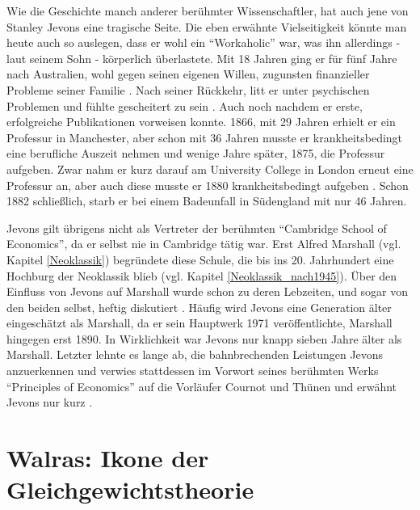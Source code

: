 Wie die Geschichte manch anderer berühmter Wissenschaftler, hat auch jene von Stanley Jevons eine tragische Seite. Die eben erwähnte Vielseitigkeit könnte man heute auch so auslegen, dass er wohl ein "`Workaholic"' war, was ihn allerdings - laut seinem Sohn \parencite[S. 230]{Jevons1934} - körperlich überlastete. Mit 18 Jahren ging er für fünf Jahre nach Australien, wohl gegen seinen eigenen Willen, zugunsten finanzieller Probleme seiner Familie \parencite[S. 518]{Keynes1936a}. Nach seiner Rückkehr, litt er unter psychischen Problemen und fühlte gescheitert zu sein \parencite[S. 527]{Keynes1936a}. Auch noch nachdem er erste, erfolgreiche Publikationen vorweisen konnte.  1866, mit 29 Jahren erhielt er ein Professur in Manchester, aber schon mit 36 Jahren musste er krankheitsbedingt eine berufliche Auszeit nehmen und wenige Jahre später, 1875, die Professur aufgeben. Zwar nahm er kurz darauf am University College in London erneut eine Professur an, aber auch diese musste er 1880 krankheitsbedingt aufgeben \parencite[S. 230]{Jevons1934}. Schon 1882 schließlich, starb er bei einem Badeunfall in Südengland mit nur 46 Jahren.

Jevons gilt übrigens nicht als Vertreter der berühmten "`Cambridge School of Economics"', da er selbst nie in Cambridge tätig war. Erst Alfred Marshall (vgl. Kapitel \ref{Neoklassik}) begründete diese Schule, die bis ins 20. Jahrhundert eine Hochburg der Neoklassik blieb (vgl. Kapitel \ref{Neoklassik_nach1945}). Über den Einfluss von Jevons auf Marshall wurde schon zu deren Lebzeiten, und sogar von den beiden selbst, heftig diskutiert \parencite[S. 536]{Keynes1936a}. Häufig wird Jevons eine Generation älter eingeschätzt als Marshall, da er sein Hauptwerk 1971 veröffentlichte, Marshall hingegen erst 1890. In Wirklichkeit war Jevons nur knapp sieben Jahre älter als Marshall. Letzter lehnte es lange ab, die bahnbrechenden Leistungen Jevons anzuerkennen \parencite[S. 535]{Keynes1936a} und verwies stattdessen im Vorwort seines berühmten Werks "`Principles of Economics"' auf die Vorläufer Cournot und Thünen und erwähnt Jevons nur kurz \parencite[S. XXII]{Marshall1890}. 


\section{Walras: Ikone der Gleichgewichtstheorie}
\label{Walras}

